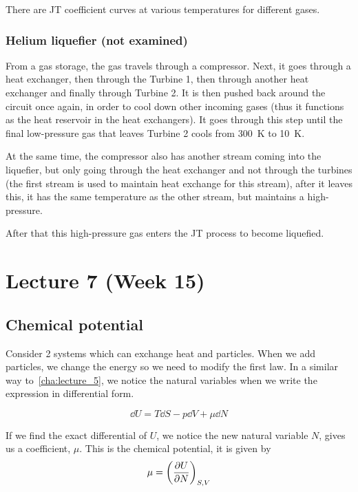\documentclass[12pt,chapterprefix=false,dvipsnames]{scrbook}
\theoremstyle{dotless}
\theoremstyle{definition}
\begin{document}
There are JT coefficient curves at various temperatures for
different gases.

\subsection{Helium liquefier (not examined)}%
\label{sub:helium_liquefier}

From a gas storage, the gas travels through a compressor. Next,
it goes through a heat exchanger, then through the Turbine 1,
then through another heat exchanger and finally through Turbine
2. It is then pushed back around the circuit once again, in
order to cool down other incoming gases (thus it functions as
the heat reservoir in the heat exchangers). It goes through this
step until the final low-pressure gas that leaves Turbine 2
cools from \si{300\kelvin} to \si{10\kelvin}.

At the same time, the compressor also has another stream coming
into the liquefier, but only going through the heat exchanger
and not through the turbines (the first stream is used to
maintain heat exchange for this stream), after it leaves this,
it has the same temperature as the other stream, but maintains a
high-pressure.

After that this high-pressure gas enters the JT process to
become liquefied.

\chapter{Lecture 7 (Week 15)}%
\label{cha:lecture_7}

\section{Chemical potential}%
\label{sec:chemical_potential}

Consider 2 systems which can exchange heat and particles. When
we add particles, we change the energy so we need to modify the
first law. In a similar way to~\ref{cha:lecture_5}, we
notice the natural variables when we write the expression in
differential form.

\begin{equation}
	\label{eq:first_law_chemical_potential}
	\dd{U} = T\dd{S} -
	p\dd{V} + \mu\dd{N}
\end{equation}

If we find the exact differential of $U$, we
notice the new natural variable $N$, gives
us a coefficient, $\mu$. This is the chemical
potential, it is given by
\begin{equation}
	\label{eq:chemical_potential}
	\mu
	=
	{\left(\pdv{U}{N}\right)}_{S,V}
\end{equation}
\end{document}
